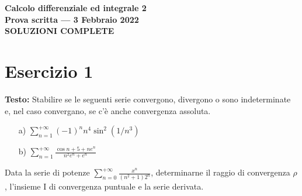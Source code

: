 \documentclass[12pt, a4paper]{article}
\begin{document}
\begin{center}
\Large\textbf{Calcolo differenziale ed integrale 2}\\
\large\textbf{Prova scritta --- 3 Febbraio 2022}\\
\large\textbf{SOLUZIONI COMPLETE}
\end{center}

\vspace{1cm}

\section*{Esercizio 1}

\textbf{Testo:} Stabilire se le seguenti serie convergono, divergono o sono indeterminate e, nel caso convergano, se c'è anche convergenza assoluta.
\begin{enumerate}
    \item[a)] $\displaystyle\sum_{n=1}^{+\infty} (-1)^{n} n^{4} \sin^{2}(1/n^{3})$
    \item[b)] $\displaystyle\sum_{n=1}^{+\infty} \frac{\cos n + 5 + ne^{n}}{n^{2}e^{n}+e^{n}}$
\end{enumerate}
Data la serie di potenze $\displaystyle\sum_{n=0}^{+\infty} \frac{x^{n}}{(n^{2}+1)2^{n}}$, determinarne il raggio di convergenza $\rho$, l'insieme I di convergenza puntuale e la serie derivata.
\end{document}
